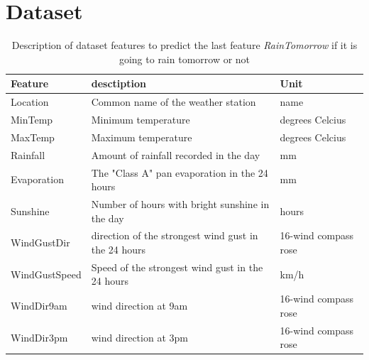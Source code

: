 \documentclass[11pt]{article}
\begin{document}
\section{Dataset}
\label{app:dataset}
\begin{table}[H]
    \begin{small}
        \caption{Description of dataset features to predict the last feature \textit{RainTomorrow} if it is going to rain tomorrow or not }
        \label{tab:features}
        \begin{center}
            \begin{tabular}{|l|l|l|}
                \hline
                \textbf{Feature} & \textbf{desctiption}                                 & \textbf{Unit}           \\
                \hline
                \hline
                Location         & Common name of the weather station                   & name                    \\
                \hline
                MinTemp          & Minimum temperature                                  & degrees Celcius         \\
                \hline
                MaxTemp          & Maximum temperature                                  & degrees Celcius         \\
                \hline
                Rainfall         & Amount of rainfall recorded in the day               & mm                      \\
                \hline
                Evaporation      & The "Class A" pan evaporation in the 24 hours        & mm                      \\
                \hline
                Sunshine         & Number of hours with bright sunshine in the day      & hours                   \\
                \hline
                WindGustDir      & direction of the strongest wind gust in the 24 hours & 16-wind compass rose    \\
                \hline
                WindGustSpeed    & Speed of the strongest wind gust in the 24 hours     & km/h                    \\
                \hline
                WindDir9am       & wind direction at 9am                                & 16-wind compass rose    \\
                \hline
                WindDir3pm       & wind direction at 3pm                                & 16-wind compass rose    \\

\end{tabular}
\end{center}
\end{small}
\end{table}
\end{document}

